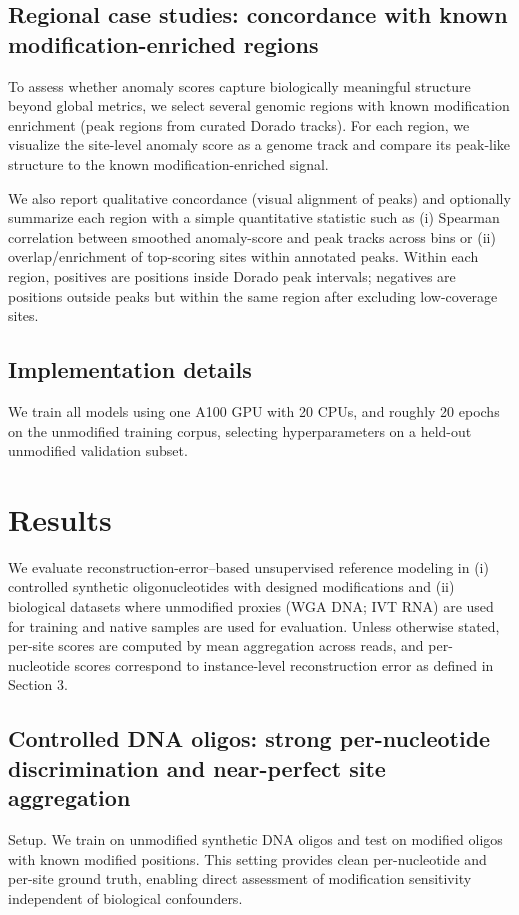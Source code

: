 \documentclass[journal,article,submit,pdftex,moreauthors]{Definitions/mdpi}
\begin{document}
\subsection{Regional case studies: concordance with known modification-enriched regions}
To assess whether anomaly scores capture biologically meaningful structure beyond global metrics, we select several genomic regions with known modification enrichment (peak regions from curated Dorado tracks). For each region, we visualize the site-level anomaly score  as a genome track and compare its peak-like structure to the known modification-enriched signal.

We also report qualitative concordance (visual alignment of peaks) and optionally summarize each region with a simple quantitative statistic such as (i) Spearman correlation between smoothed anomaly-score and peak tracks across bins or (ii) overlap/enrichment of top-scoring sites within annotated peaks. Within each region, positives are positions inside Dorado peak intervals; negatives are positions outside peaks but within the same region after excluding low-coverage sites.

\subsection{Implementation details}
We train all models using one A100 GPU with 20 CPUs, and roughly 20 epochs on the unmodified training corpus, selecting hyperparameters on a held-out unmodified validation subset.

\section{Results}
We evaluate reconstruction-error--based unsupervised reference modeling in (i) controlled synthetic oligonucleotides with designed modifications and (ii) biological datasets where unmodified proxies (WGA DNA; IVT RNA) are used for training and native samples are used for evaluation. Unless otherwise stated, per-site scores are computed by mean aggregation across reads, and per-nucleotide scores correspond to instance-level reconstruction error as defined in Section 3.

\subsection{Controlled DNA oligos: strong per-nucleotide discrimination and near-perfect site aggregation}

Setup. We train on unmodified synthetic DNA oligos and test on modified oligos with known modified positions. This setting provides clean per-nucleotide and per-site ground truth, enabling direct assessment of modification sensitivity independent of biological confounders.
\end{document}
